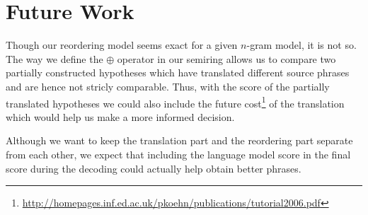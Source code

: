 \documentclass[11pt]{article}
\numberwithin{equation}{section}
\begin{document}
\section{Future Work}
Though our reordering model seems exact for a given $n$-gram model, it is not so. The way we define the $\oplus$ operator
in our semiring allows us to compare two partially constructed hypotheses which have translated different source phrases
and are hence not stricly comparable. Thus, with the score of the partially translated hypotheses we could also include
the future cost\footnote{\url{http://homepages.inf.ed.ac.uk/pkoehn/publications/tutorial2006.pdf}} of the translation which would help 
us make a more informed decision.

Although we want to keep the translation part and the reordering part separate from each other, we expect that including the language 
model score in the final score during the decoding could actually help obtain better phrases.



\end{document}
